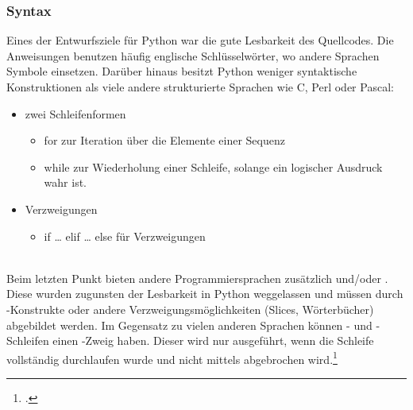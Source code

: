 \subsubsection{Syntax}
Eines der Entwurfsziele für Python war die gute Lesbarkeit des Quellcodes. Die Anweisungen benutzen häufig englische Schlüsselwörter, wo andere Sprachen Symbole einsetzen. Darüber hinaus besitzt Python weniger syntaktische Konstruktionen als viele andere strukturierte Sprachen wie C, Perl oder Pascal:\\
\begin{itemize}
\item zwei Schleifenformen
	\begin{itemize}
		\item for zur Iteration über die Elemente einer Sequenz
		\item while zur Wiederholung einer Schleife, solange ein logischer Ausdruck wahr ist.
	\end{itemize}
\item Verzweigungen
	\begin{itemize}
		\item if … elif … else für Verzweigungen
	\end{itemize}
\end{itemize}
\ \\
Beim letzten Punkt bieten andere Programmiersprachen zusätzlich  und/oder . Diese wurden zugunsten der Lesbarkeit in Python weggelassen und müssen durch -Konstrukte oder andere Verzweigungsmöglichkeiten (Slices, Wörterbücher) abgebildet werden. Im Gegensatz zu vielen anderen Sprachen können - und -Schleifen einen -Zweig haben. Dieser wird nur ausgeführt, wenn die Schleife vollständig durchlaufen wurde und nicht mittels  abgebrochen wird.\footcite{python_wiki}

